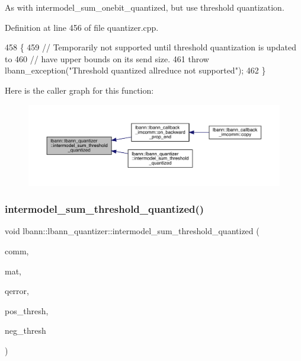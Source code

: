 As with intermodel\+\_\+sum\+\_\+onebit\+\_\+quantized, but use threshold quantization. 

Definition at line 456 of file quantizer.\+cpp.


\begin{DoxyCode}
458                        \{
459   \textcolor{comment}{// Temporarily not supported until threshold quantization is updated to}
460   \textcolor{comment}{// have upper bounds on its send size.}
461   \textcolor{keywordflow}{throw} lbann\_exception(\textcolor{stringliteral}{"Threshold quantized allreduce not supported"});
462 \}
\end{DoxyCode}
Here is the caller graph for this function\+:\nopagebreak
\begin{figure}[H]
\begin{center}
\leavevmode
\includegraphics[width=350pt]{classlbann_1_1lbann__quantizer_a0bd572557675705c5e080b92d74b02ae_icgraph}
\end{center}
\end{figure}
\mbox{\label{classlbann_1_1lbann__quantizer_ac2afc78996f35d90b5d0462292a1a2e3}} 
\subsubsection{\texorpdfstring{intermodel\+\_\+sum\+\_\+threshold\+\_\+quantized()}{intermodel\_sum\_threshold\_quantized()}\hspace{0.1cm}{\footnotesize\ttfamily [2/2]}}
{\footnotesize\ttfamily void lbann\+::lbann\+\_\+quantizer\+::intermodel\+\_\+sum\+\_\+threshold\+\_\+quantized (\begin{DoxyParamCaption}\item[{\hyperlink{classlbann_1_1lbann__comm}{lbann\+\_\+comm} $\ast$}]{comm,  }\item[{\hyperlink{base_8hpp_a0fab5387556805cfeac3e7e567bf66c5}{Dist\+Mat} \&}]{mat,  }\item[{\hyperlink{base_8hpp_a68f11fdc31b62516cb310831bbe54d73}{Mat} \&}]{qerror,  }\item[{Data\+Type}]{pos\+\_\+thresh,  }\item[{Data\+Type}]{neg\+\_\+thresh }\end{DoxyParamCaption})}



